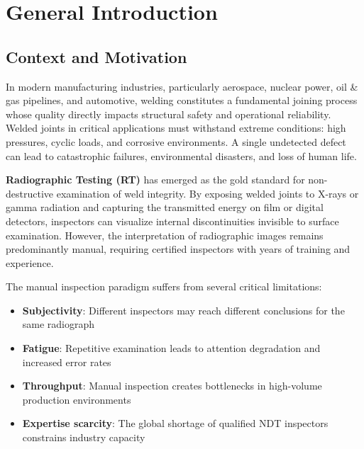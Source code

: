 \documentclass[12pt,a4paper]{report}
\begin{document}
\clearpage
\tableofcontents
\clearpage
\listoffigures
{}
\clearpage
\listoftables
{}

\clearpage
{}
\setcounter{page}{1}
\pagestyle{fancy}
\onehalfspacing

\chapter*{General Introduction}

\section*{Context and Motivation}

In modern manufacturing industries, particularly aerospace, nuclear power, oil \& gas pipelines, and automotive, welding constitutes a fundamental joining process whose quality directly impacts structural safety and operational reliability. 
Welded joints in critical applications must withstand extreme conditions: high pressures, cyclic loads, and corrosive environments. A single undetected defect can lead to catastrophic failures, environmental disasters, and loss of human life.

\textbf{Radiographic Testing (RT)} has emerged as the gold standard for non-destructive examination of weld integrity. By exposing welded joints to X-rays or gamma radiation and capturing the transmitted energy on film or digital detectors, inspectors can visualize internal discontinuities invisible to surface examination. However, the interpretation of radiographic images remains predominantly manual, requiring certified inspectors with years of training and experience.

The manual inspection paradigm suffers from several critical limitations:
\begin{itemize}
    \item \textbf{Subjectivity}: Different inspectors may reach different conclusions for the same radiograph
    \item \textbf{Fatigue}: Repetitive examination leads to attention degradation and increased error rates
    \item \textbf{Throughput}: Manual inspection creates bottlenecks in high-volume production environments
    \item \textbf{Expertise scarcity}: The global shortage of qualified NDT inspectors constrains industry capacity
\end{itemize}
\end{document}
